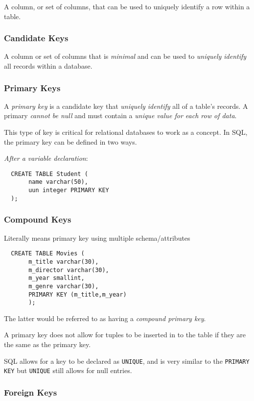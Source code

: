 \documentclass{article}
\begin{document}
A column, or set of columns, that can be used to uniquely identify a row within a table.

\subsubsection*{Candidate Keys}

A column or set of columns that is \textit{minimal} and can be used to \textit{uniquely identify} all records within a database.

\subsubsection*{Primary Keys}

A \textit{primary key} is a candidate key that \textit{uniquely identify} all of a table's records. A primary \textit{cannot be null} and must contain a \textit{unique value for each row of data}.

This type of key is critical for relational databases to work as a concept. In SQL, the primary key can be defined in two ways.

\textit{After a variable declaration}:

\begin{lstlisting}
  CREATE TABLE Student (
       name varchar(50),
       uun integer PRIMARY KEY
  );
\end{lstlisting}

\subsubsection*{Compound Keys}
Literally means primary key using multiple schema/attributes

\begin{lstlisting}
  CREATE TABLE Movies (
       m_title varchar(30),
       m_director varchar(30),
       m_year smallint,
       m_genre varchar(30),
       PRIMARY KEY (m_title,m_year)
       );
\end{lstlisting}

The latter would be referred to as having a \textit{compound primary key}.

A primary key does not allow for tuples to be inserted in to the table if they are the same as the primary key.

SQL allows for a key to be declared as \texttt{UNIQUE}, and is very similar to the \texttt{PRIMARY KEY} but \texttt{UNIQUE} still allows for null entries.

\subsubsection*{Foreign Keys}
\end{document}

